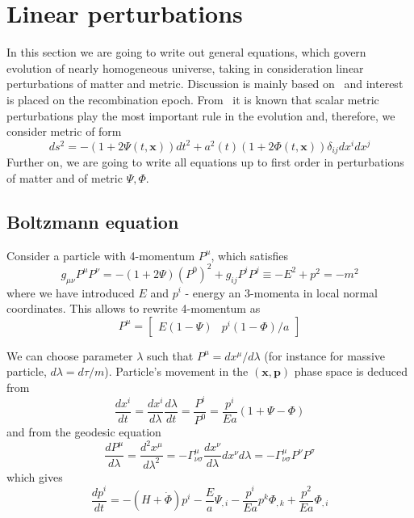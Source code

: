 \documentclass[12pt]{extarticle}
\numberwithin{problem}{section}
\numberwithin{theorem}{section}
\begin{document}
	\section{Linear perturbations}
	In this section we are going to write out general equations, which govern evolution of nearly homogeneous universe, taking in consideration linear perturbations of matter and metric. Discussion is mainly based on~\cite{dodelson:2003} and interest is placed on the recombination epoch. From~\cite{gorbunov-rubakov-2:2011} it is known that scalar metric perturbations play the most important rule in the evolution and, therefore, we consider metric of form
	\begin{equation}
		\label{eq:perturb:metric}
		ds^2 = -(1 + 2\Psi(t, \mathbf{x}))dt^2 + a^2(t)(1 + 2\Phi(t, \mathbf{x}))\delta_{ij}dx^idx^j	
	\end{equation}
	Further on, we are going to write all equations up to first order in perturbations of matter and of metric $\Psi, \Phi$.
	
	\subsection{Boltzmann equation}
	Consider a particle with 4-momentum $P^\mu$, which satisfies 
	\begin{equation}
		g_{\mu\nu} P^\mu P^\nu = -(1 + 2\Psi)(P^0)^2 + g_{ij}P^iP^j \equiv -E^2 + p^2 = -m^2
	\end{equation}
	where we have introduced $E$ and $p^i$ - energy an 3-momenta in local normal coordinates. This allows to rewrite 4-momentum as 
	\begin{equation}
		\label{eq:4-momentum}
		P^\mu = \begin{bmatrix}
			E(1 - \Psi) & p^i(1 - \Phi) / a
		\end{bmatrix}
	\end{equation}
	
	We can choose parameter $\lambda$ such that $P^\mu = dx^\mu/d\lambda$ (for instance for massive particle, $d\lambda = d\tau/m$). Particle's movement in the $(\mathbf{x},\mathbf{p})$ phase space is deduced from
	\begin{equation}
		\label{eq:boltzmann:position}
		\frac{dx^i}{dt} = \frac{dx^i}{d\lambda}\frac{d\lambda}{dt} = \frac{P^i}{P^0} = \frac{p^i}{Ea}(1+\Psi-\Phi)
	\end{equation}
	and from the geodesic equation
	\begin{equation}
		\label{eq:boltzmann:momentum}
		\frac{dP^\mu}{d\lambda} = \frac{d^2x^\mu}{d\lambda^2} = -\Gamma^\mu_{\nu\sigma}\frac{dx^\nu}{d\lambda}{dx^\nu}{d\lambda} = -\Gamma^\mu_{\nu\sigma}P^\nu P^\sigma
	\end{equation}
	which gives
	\begin{equation}
		\frac{dp^i}{dt} = -(H + \dot{\Phi})p^i - \frac{E}{a}\Psi_{,i} - \frac{p^i}{Ea}p^k\Phi_{,k} + \frac{p^2}{Ea}\Phi_{,i}
	\end{equation}
\end{document}
